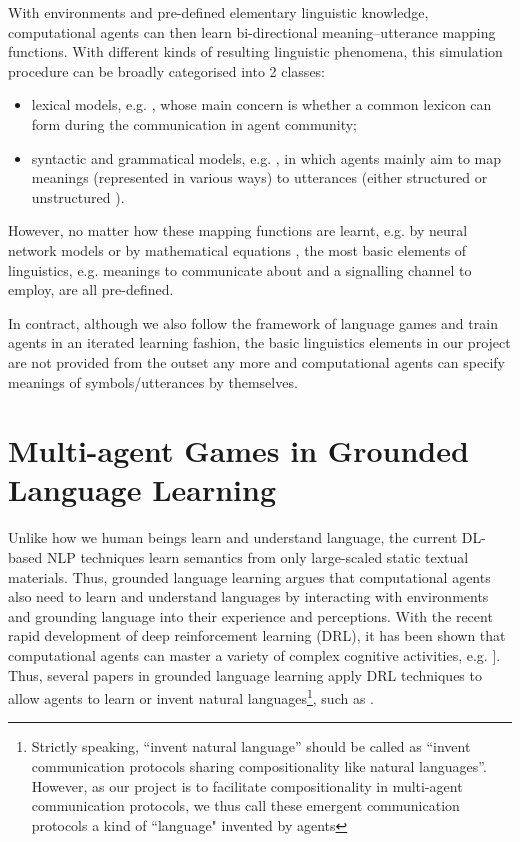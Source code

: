 With environments and pre-defined elementary linguistic knowledge, computational agents can then learn bi-directional meaning–utterance mapping functions\cite{gong2013computer}. With different kinds of resulting linguistic phenomena, this simulation procedure can be broadly categorised into 2 classes:
\begin{itemize}
  \item lexical models, e.g. \cite{steels2005emergence, baronchelli2006sharp, puglisi2008cultural}, whose main concern is whether a common lexicon can form during the communication in agent community;
  \item syntactic and grammatical models, e.g. \cite{kirby1999function, vogt2005acquisition}, in which agents mainly aim to map meanings (represented in various ways) to utterances (either structured or unstructured ).
\end{itemize}

However, no matter how these mapping functions are learnt, e.g. by neural network models \cite{munroe2002learning} or by mathematical equations \cite{minett2008modelling, ke2008language}, the most basic elements of linguistics, e.g. meanings to communicate about and a signalling channel to employ, are all pre-defined.

In contract, although we also follow the framework of language games and train agents in an iterated learning fashion, the basic linguistics elements in our project are not provided from the outset any more and computational agents can specify meanings of symbols/utterances by themselves.

\section{Multi-agent Games in Grounded Language Learning}
\label{sec2.2:gll}

Unlike how we human beings learn and understand language, the current DL-based NLP techniques learn semantics from only large-scaled static textual materials. Thus, grounded language learning argues that computational agents also need to learn and understand languages by interacting with environments and grounding language into their experience and perceptions. With the recent rapid development of deep reinforcement learning (DRL), it has been shown that computational agents can master a variety of complex cognitive activities, e.g. \cite{mnih2015human, silver2017mastering}]. Thus, several papers in grounded language learning apply DRL techniques to allow agents to learn or invent natural languages\footnote{Strictly speaking, ``invent natural language'' should be called as ``invent communication protocols sharing compositionality like natural languages''. However, as our project is to facilitate compositionality in multi-agent communication protocols, we thus call these emergent communication protocols a kind of ``language" invented by agents}, such as \cite{hermann2017grounded, mordatch2018emergence, havrylov2017emergence, hill2017understanding}.

